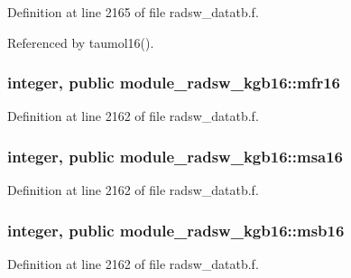 Definition at line 2165 of file radsw\+\_\+datatb.\+f.



Referenced by taumol16().

\subsubsection[{\texorpdfstring{mfr16}{mfr16}}]{\setlength{\rightskip}{0pt plus 5cm}integer, public module\+\_\+radsw\+\_\+kgb16\+::mfr16}\hypertarget{namespacemodule__radsw__kgb16_aeee3fe8e44f6fbd9a6a008bc9f97f37c}{}\label{namespacemodule__radsw__kgb16_aeee3fe8e44f6fbd9a6a008bc9f97f37c}


Definition at line 2162 of file radsw\+\_\+datatb.\+f.

\subsubsection[{\texorpdfstring{msa16}{msa16}}]{\setlength{\rightskip}{0pt plus 5cm}integer, public module\+\_\+radsw\+\_\+kgb16\+::msa16}\hypertarget{namespacemodule__radsw__kgb16_ad76a9d79e77228ac93ec3db96eed2b29}{}\label{namespacemodule__radsw__kgb16_ad76a9d79e77228ac93ec3db96eed2b29}


Definition at line 2162 of file radsw\+\_\+datatb.\+f.

\subsubsection[{\texorpdfstring{msb16}{msb16}}]{\setlength{\rightskip}{0pt plus 5cm}integer, public module\+\_\+radsw\+\_\+kgb16\+::msb16}\hypertarget{namespacemodule__radsw__kgb16_a2ce1ab36897fb1fc7d85cbf7fe539e59}{}\label{namespacemodule__radsw__kgb16_a2ce1ab36897fb1fc7d85cbf7fe539e59}


Definition at line 2162 of file radsw\+\_\+datatb.\+f.

